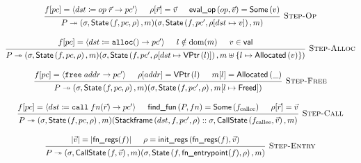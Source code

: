 \documentclass[report.tex]{subfiles}
\begin{document}
\begin{figure}[htb]
  \begin{gather*}
    \begin{prooftree}
      \hypo{\pcatis{f}{pc}{\Iop{dst}{op}{\vec{r}}{pc'}}}
      \hypo{\getreg{\vec{r}}{\rho} = \vec{v}}
      \hypo{\evalop{op}{\vec{v}} = \Some{v}}
      \infer3[\textsc{Step-Op}]{
        \step{P}{
          (\sigma, \State{f}{pc}{\rho}, m)
        }{
          (\sigma, \State{f}{pc'}{\setreg{dst}{v}{\rho}}, m)
        }
      }
    \end{prooftree}
    \\[1em]
    \begin{prooftree}
      \hypo{\pcatis{f}{pc}{\Ialloc{dst}{pc'}}}
      \hypo{l \notin \dom{m}}
      \hypo{v \in \val}
      \infer3[\textsc{Step-Alloc}]{
        \step{P}{
          (\sigma, \State{f}{pc}{\rho}, m)
        }{
          (\sigma,
           \State{f}{pc'}{\setreg{dst}{\VPtr{l}}{\rho}},
           \allocat{l}{v}{m})
        }
      }
    \end{prooftree}
    \\[1em]
    \begin{prooftree}
      \hypo{\pcatis{f}{pc}{\Ifree{addr}{pc'}}}
      \hypo{\getreg{addr}{\rho} = \VPtr{l}}
      \hypo{\getat{l}{m} = \Allocated{\_}}
      \infer3[\textsc{Step-Free}]{
        \step{P}{
          (\sigma, \State{f}{pc}{\rho}, m)
        }{
          (\sigma, \State{f}{pc'}{\rho}, \freeat{l}{m})
        }
      }
    \end{prooftree}
    \\[1em]
    \begin{prooftree}
      \hypo{\pcatis{f}{pc}{\Icall{dst}{fn}{\vec{r}}{pc'}}}
      \hypo{\findfun{P}{fn} = \Some{f_{\text{callee}}}}
      \hypo{\getreg{\vec{r}}{\rho} = \vec{v}}
      \infer3[\textsc{Step-Call}]{
        \step{P}{
          (\sigma, \State{f}{pc}{\rho}, m)
        }{
          (\Stackframe{dst}{f}{pc'}{\rho} :: \sigma,
           \CallState{f_{\text{callee}}}{\vec{v}},
           m)
        }
      }
    \end{prooftree}
    \\[1em]
    \begin{prooftree}
      \hypo{|\vec{v}| = |\fnregs(f)|}
      \hypo{\rho = \initregs{\fnregs(f)}{\vec{v}}}
      \infer2[\textsc{Step-Entry}]{
        \step{P}{
          (\sigma, \CallState{f}{\vec{v}}, m)
        }{
          (\sigma, \State{f}{\fnentry(f)}{\rho}, m)
        }
      }
    \end{prooftree}
    \\[1em]

\end{gather*}
\end{figure}
\end{document}
